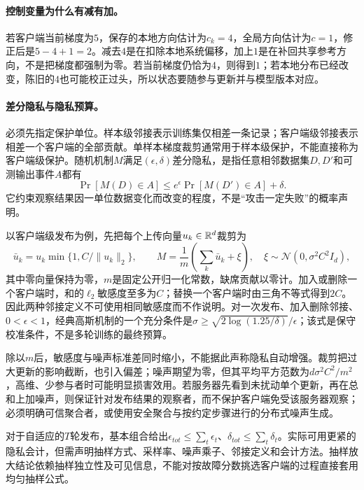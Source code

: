\paragraph{控制变量为什么有减有加。}
若客户端当前梯度为$5$，保存的本地方向估计为$c_k=4$，全局方向估计为$c=1$，修正后是$5-4+1=2$。减去$4$是在扣除本地系统偏移，加上$1$是在补回共享参考方向，不是把梯度都强制为零。若当前梯度仍恰为$4$，则得到$1$；若本地分布已经改变，陈旧的$4$也可能校正过头，所以状态要随参与更新并与模型版本对应。

\paragraph{差分隐私与隐私预算。}
必须先指定保护单位。样本级邻接表示训练集仅相差一条记录；客户端级邻接表示相差一个客户端的全部贡献。单样本梯度裁剪通常用于样本级保护，不能直接称为客户端级保护。随机机制$M$满足$(\epsilon,\delta)$差分隐私，是指任意相邻数据集$D,D'$和可测输出事件$A$都有
\begin{equation}
 \Pr[M(D)\in A]\leq e^\epsilon\Pr[M(D')\in A]+\delta.
\end{equation}
它约束观察结果因一单位数据变化而改变的程度，不是“攻击一定失败”的概率声明。

以客户端级发布为例，先把每个上传向量$u_k\in\mathbb{R}^d$裁剪为
\begin{equation}
 \bar u_k=u_k\min\{1,C/\|u_k\|_2\},\qquad
 M=\frac1m\left(\sum_k\bar u_k+\xi\right),\quad
 \xi\sim\mathcal N(0,\sigma^2C^2I_d),
\end{equation}
其中零向量保持为零，$m$是固定公开归一化常数，缺席贡献以零计。加入或删除一个客户端时，和的$\ell_2$敏感度至多为$C$；替换一个客户端时由三角不等式得到$2C$。因此两种邻接定义不可使用相同敏感度而不作说明。对一次发布、加入删除邻接、$0<\epsilon<1$，经典高斯机制的一个充分条件是$\sigma\geq\sqrt{2\log(1.25/\delta)}/\epsilon$；该式是保守校准条件，不是多轮训练的最终预算。

除以$m$后，敏感度与噪声标准差同时缩小，不能据此声称隐私自动增强。裁剪把过大更新的影响截断，也引入偏差；噪声期望为零，但其平均平方范数为$d\sigma^2C^2/m^2$，高维、少参与者时可能明显损害效用。若服务器先看到未扰动单个更新，再在总和上加噪声，则保证针对发布结果的观察者，而不保护客户端免受该服务器观察；必须明确可信聚合者，或使用安全聚合与按约定步骤进行的分布式噪声生成。

对于自适应的$T$轮发布，基本组合给出$\epsilon_{tot}\leq\sum_t\epsilon_t$、$\delta_{tot}\leq\sum_t\delta_t$。实际可用更紧的隐私会计，但需声明抽样方式、采样率、噪声乘子、邻接定义和会计方法。抽样放大结论依赖抽样独立性及可见信息，不能对按故障分数挑选客户端的过程直接套用均匀抽样公式。

